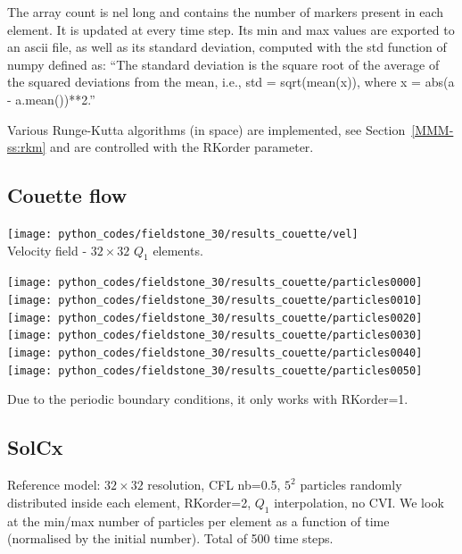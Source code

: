 The array {\python count} is {\python nel} long and contains the number of markers present in each element.
It is updated at every time step. Its min and max values are exported to an ascii file, as well 
as its standard deviation, computed with the {\python std} function of numpy defined as:
``The standard deviation is the square root of the average of the squared deviations from the mean, 
i.e., std = sqrt(mean(x)), where x = abs(a - a.mean())**2.''

Various Runge-Kutta algorithms (in space) are implemented, see Section~\ref{MMM-ss:rkm} and are 
controlled with the {\python RKorder} parameter.

\subsection*{Couette flow}

\begin{center}
\texttt{[image: python\_codes/fieldstone\_30/results\_couette/vel]}\\
{\captionfont Velocity field - $32 \times 32$ $Q_1$ elements.}
\end{center}

\begin{center}
\texttt{[image: python\_codes/fieldstone\_30/results\_couette/particles0000]}
\texttt{[image: python\_codes/fieldstone\_30/results\_couette/particles0010]}
\texttt{[image: python\_codes/fieldstone\_30/results\_couette/particles0020]}\\
\texttt{[image: python\_codes/fieldstone\_30/results\_couette/particles0030]}
\texttt{[image: python\_codes/fieldstone\_30/results\_couette/particles0040]}
\texttt{[image: python\_codes/fieldstone\_30/results\_couette/particles0050]}
\end{center}

Due to the periodic boundary conditions, it only works with {\python RKorder}=1.

\newpage
\subsection*{SolCx}

Reference model: $32\times 32$ resolution, CFL nb=0.5, $5^2$ particles randomly distributed inside each 
element, RKorder=2, $Q_1$ interpolation, no CVI.
We look at the min/max number of particles per element as a function of time (normalised 
by the initial number). Total of 500 time steps.

